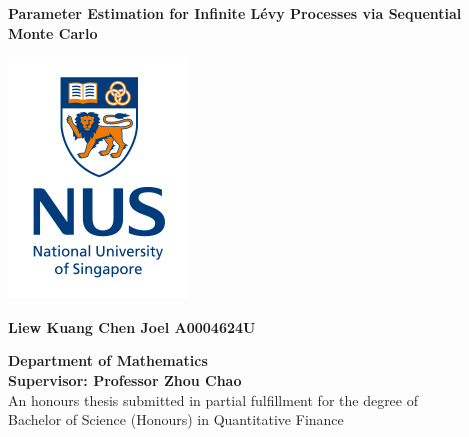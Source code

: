 \documentclass[12pt]{article}
\theoremstyle{definition}
\begin{document}
\begin{titlepage}
    \begin{center}
        
        \LARGE
        \textbf{Parameter Estimation for Infinite L\'{e}vy Processes via Sequential Monte Carlo}

        
        \vspace{1.5cm}
        \includegraphics[scale=1.2]{university}\\
        \vspace{1.5cm}
        
        \large
        \textbf{Liew Kuang Chen Joel A0004624U}

        \large
        \textbf{Department of Mathematics} \\
		\textbf{Supervisor: Professor Zhou Chao}\\
        
        \vfill
        \small
        An honours thesis submitted in partial fulfillment for the degree of\\
		Bachelor of Science (Honours) in Quantitative Finance
        

        
        

        
    \end{center}
\end{titlepage}
\end{document}
